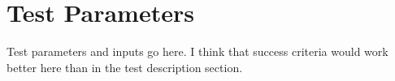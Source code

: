

\section{Test Parameters}

Test parameters and inputs go here. I think that success criteria would work better here than in the test description section.